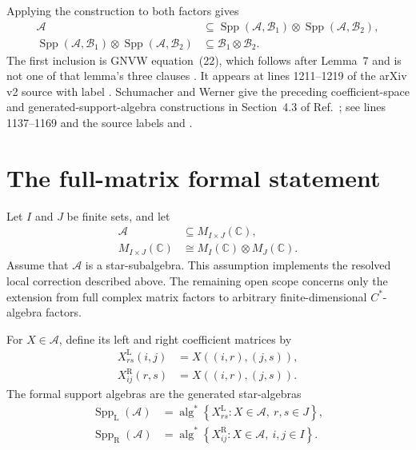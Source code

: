 \documentclass[11pt]{article}
\begin{document}
Applying the construction to both factors gives
\begin{align}
    \mathcal A
    &\subseteq
      \operatorname{Spp}(\mathcal A,\mathcal B_1)
      \otimes
      \operatorname{Spp}(\mathcal A,\mathcal B_2),
    \label{eq:gnvw12_support_algebra_full_matrix_scope_two_support_containment}\\
    \operatorname{Spp}(\mathcal A,\mathcal B_1)
      \otimes
      \operatorname{Spp}(\mathcal A,\mathcal B_2)
    &\subseteq\mathcal B_1\otimes\mathcal B_2.
    \label{eq:gnvw12_support_algebra_full_matrix_scope_ambient_containment}
\end{align}
The first inclusion is GNVW equation~(22), which follows after Lemma~7 and is
not one of that lemma's three clauses
\cite{Gross2012IndexTheory}. It appears at lines 1211--1219 of the arXiv v2
source with label . Schumacher and Werner give the preceding
coefficient-space and generated-support-algebra constructions in
Section~4.3 of Ref.~\cite{SchumacherWerner2004QCA}; see lines 1137--1169 and
the source labels  and .

\section{The full-matrix formal statement}

Let $I$ and $J$ be finite sets, and let
\begin{align}
    \mathcal A
    &\subseteq M_{I\times J}(\mathbb C),
    \label{eq:gnvw12_support_algebra_full_matrix_scope_matrix_input}\\
    M_{I\times J}(\mathbb C)
    &\cong M_I(\mathbb C)\otimes M_J(\mathbb C).
    \label{eq:gnvw12_support_algebra_full_matrix_scope_matrix_factorization}
\end{align}
Assume that $\mathcal A$ is a star-subalgebra. This assumption implements the
resolved local correction described above. The remaining open scope concerns
only the extension from full complex matrix factors to arbitrary
finite-dimensional $C^*$-algebra factors.

For $X\in\mathcal A$, define its left and right coefficient matrices by
\begin{align}
    X^{\mathrm L}_{rs}(i,j)
    &=X((i,r),(j,s)),
    \label{eq:gnvw12_support_algebra_full_matrix_scope_left_coefficient}\\
    X^{\mathrm R}_{ij}(r,s)
    &=X((i,r),(j,s)).
    \label{eq:gnvw12_support_algebra_full_matrix_scope_right_coefficient}
\end{align}
The formal support algebras are the generated star-algebras
\begin{align}
    \operatorname{Spp}_{\mathrm L}(\mathcal A)
    &=\operatorname{alg}^*
      \left\{X^{\mathrm L}_{rs}:
      X\in\mathcal A,\ r,s\in J\right\},
    \label{eq:gnvw12_support_algebra_full_matrix_scope_left_support}\\
    \operatorname{Spp}_{\mathrm R}(\mathcal A)
    &=\operatorname{alg}^*
      \left\{X^{\mathrm R}_{ij}:
      X\in\mathcal A,\ i,j\in I\right\}.
    \label{eq:gnvw12_support_algebra_full_matrix_scope_right_support}
\end{align}
\end{document}
